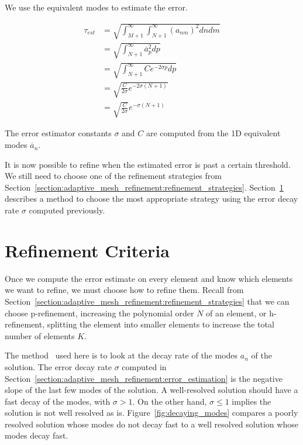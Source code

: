 \noindent
We use the equivalent modes to estimate the error.

\begin{equation}
    \begin{aligned}
        \tau_{est} &= \sqrt{\int_{M+1}^{\infty }\int_{N + 1 }^{\infty}{(a_{nm})}^2 dn dm} \\
        &= \sqrt{\int_{N + 1}^{\infty }\overline{a}_p^2 dp} \\
        &= \sqrt{\int_{N + 1}^{\infty} Ce^{-2\sigma p}dp} \\
        &= \sqrt{\frac{C}{2\sigma}e^{-2\sigma(N + 1)}} \\
        &= \sqrt{\frac{C}{2\sigma}} e^{-\sigma (N + 1)}
    \end{aligned}
\end{equation}

\noindent
The error estimator constants \(\sigma \) and \(C\) are computed from the 1D equivalent modes
\(\overline{a}_n\).

It is now possible to refine when the estimated error is past a certain threshold. We still need to
choose one of the refinement strategies from
Section~\ref{section:adaptive_mesh_refinement:refinement_strategies}.
Section~\ref{section:adaptive_mesh_refinement:refinement_criteria} describes a method to choose the
most appropriate strategy using the error decay rate \(\sigma \) computed previously.

\section{Refinement Criteria}\label{section:adaptive_mesh_refinement:refinement_criteria}

Once we compute the error estimate on every element and know which elements we want to refine, we
must choose how to refine them. Recall from
Section~\ref{section:adaptive_mesh_refinement:refinement_strategies} that we can choose
p-refinement, increasing the polynomial order \(N\) of an element, or h-refinement, splitting the
element into smaller elements to increase the total number of elements \(K\).

The method~\cite{Mavriplis1990} used here is to look at the decay rate of the modes \(a_n\) of the
solution. The error decay rate \(\sigma \) computed in
Section~\ref{section:adaptive_mesh_refinement:error_estimation} is the negative slope of the last
few modes of the solution. A well-resolved solution should have a fast decay of the modes, with
\(\sigma > 1\). On the other hand, \(\sigma \leqslant 1\) implies the solution is not well resolved
as is. Figure~\ref{fig:decaying_modes} compares a poorly resolved solution whose modes do not decay
fast to a well resolved solution whose modes decay fast.

